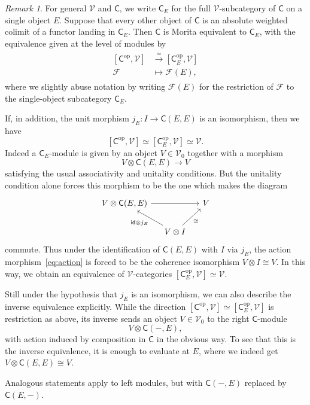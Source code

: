 \documentclass[11pt,onecolumn]{article}
\newcommand{\id}{\mathsf{id}}
\newcommand{\cV}{\mathscr{V}}
\newcommand{\cC}{\mathsf{C}}
\newcommand{\op}{\mathrm{op}}
\theoremstyle{plain}
\theoremstyle{remark}
\newtheorem{remark}[remark]{Remark}
\theoremstyle{definition}
\begin{document}
\begin{remark}
\label{ex:mor}
	For general $\cV$ and $\cC$,
	we write $\cC_E$ for the full $\cV$-subcategory of $\cC$ on a single object $E$.
	Suppose that every other object of $\cC$ is an absolute weighted colimit of a functor landing in $\cC_E$.
	Then $\cC$ is Morita equivalent to $\cC_E$,
	with the equivalence given at the level of modules by
	\begin{align}
		\label{eq:morita_equivalence}
		\begin{split}
			[\cC^\op, \cV] & \stackrel{\simeq}{\longrightarrow} [\cC_E^\op, \cV] \\[2pt]
			\mathcal{F} & \longmapsto \mathcal{F}(E),
		\end{split}
	\end{align}
	where we slightly abuse notation by writing $\mathcal{F}(E)$ for the restriction of $\mathcal{F}$ to the single-object subcategory $\cC_E$.

	If, in addition, the unit morphism $j_E : I \to \cC(E,E)$ is an isomorphism, then we have
	\begin{equation}
		\label{eq:morita_equivalence_EE_is_I}
		[\cC^\op, \cV] \simeq
		[\cC_E^\op, \cV] \simeq \cV.
	\end{equation}
	Indeed a $\cC_E$-module is given by an object $V \in \cV_0$ together with a morphism
	\begin{equation}
		\label{eq:action}
		V \otimes \cC(E, E) \longrightarrow V
	\end{equation}
	satisfying the usual associativity and unitality conditions.
	But the unitality condition alone forces this morphism to be the one which makes the diagram
	\[
		\begin{tikzcd}[column sep=small]
			V \otimes \cC(E, E) \ar[rr] & & V \\
					& V \otimes I \ar[ul, "\id \otimes j_E"] \ar[ur, "\cong"'] &
		\end{tikzcd}
	\]
	commute.
	Thus under the identification of $\cC(E, E)$ with $I$ via $j_E$, the action morphism~\eqref{eq:action} is forced to be the coherence isomorphism $V \otimes I \cong V$.
	In this way, we obtain an equivalence of $\cV$-categories $[\cC_E^\op, \cV] \simeq \cV$.

	Still under the hypothesis that $j_E$ is an isomorphism, we can also describe the inverse equivalence explicitly.
	While the direction $[\cC^\op, \cV] \simeq [\cC_E^\op, \cV]$ is restriction as above,
	its inverse sends an object $V \in \cV_0$ to the right $\cC$-module
	\[
		V \otimes \cC(-, E),
	\]
	with action induced by composition in $\cC$ in the obvious way.
	To see that this is the inverse equivalence, it is enough to evaluate at $E$, where we indeed get $V \otimes \cC(E, E) \cong V$.

	Analogous statements apply to left modules, but with $\cC(-, E)$ replaced by $\cC(E, -)$.
\end{remark}
\end{document}
